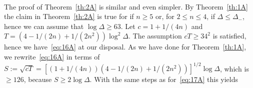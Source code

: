 \documentclass[a4paper,11pt]{amsart}
\theoremstyle{remark}
\begin{document}
\medskip\\
%
%
%
The proof of Theorem~\ref{th:2A} is similar and even simpler. By Theorem~\ref{th:1A} the claim in
Theorem~\ref{th:2A} is true for if $n\geq 5$ or, for $2\leq n\leq 4$, if $\Delta \leq \Delta_-$, hence we
can assume that $\log\Delta \geq 63$. Let $c = 1+1/(4n)$ and $T=(4-1/(2n)+1/(2n^2))\log^2\Delta$. The
assumption $cT \geq 34^2$ is satisfied, hence we have~\eqref{eq:16A} at our disposal. As we have done
for Theorem~\ref{th:1A}, we rewrite~\eqref{eq:16A} in terms of $S := \sqrt{cT} =
[(1+1/(4n))(4-1/(2n)+1/(2n^2))]^{1/2} \log\Delta$, which is $\geq 126$, because $S\geq 2\log\Delta$. With
the same steps as for~\eqref{eq:17A} this yields
%
\end{document}
